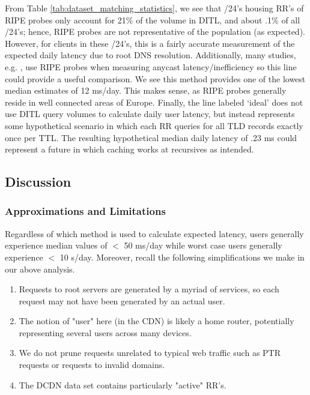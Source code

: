 \documentclass[sigconf,nonacm,10pt]{acmart}
\begin{document}
From Table \ref{tab:dataset_matching_statistics}, we see that /24's
housing RR's of RIPE probes only account for 21\% of the volume in DITL,
and about .1\% of all /24's; hence, RIPE probes are not representative
of the population (as expected). However, for clients in these /24's,
this is a fairly accurate measurement of the expected daily latency due
to root DNS resolution. Additionally, many studies, e.g.
\cite{li_levin_spring_bhattacharjee_2018}, use RIPE probes when
measuring anycast latency/inefficiency so this line could provide a
useful comparison. We see this method provides one of the lowest median
estimates of 12 ms/day. This makes sense, as RIPE probes generally
reside in well connected areas of Europe. \break \break
Finally, the line labeled `ideal' does not use DITL query volumes to
calculate daily user latency, but instead represents some hypothetical
scenario in which each RR queries for all TLD records exactly once per
TTL. The resulting hypothetical median daily latency of .23 ms could
represent a future in which caching works at recursives as intended.

\subsection{Discussion}\label{discussion}

\subsubsection{Approximations and
Limitations}\label{approximations-and-limitations}

Regardless of which method is used to calculate expected latency, users
generally experience median values of \(<\) 50 ms/day while worst case
users generally experience \(<\) 10 s/day. Moreover, recall the
following simplifications we make in our above analysis.

\begin{enumerate}
        \item Requests to root servers are generated by a myriad of services, so each request may not have been generated by an actual user.
        \item The notion of "user" here (in the CDN) is likely a home router, potentially representing several users across many devices.
        \item We do not prune requests unrelated to typical web traffic such as PTR requests or requests to invalid domains.
        \item The DCDN data set contains particularly "active" RR's.
\end{enumerate}
\end{document}
